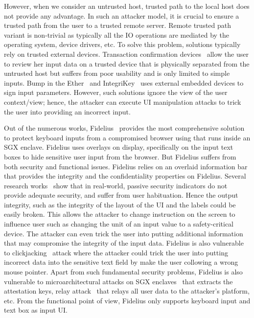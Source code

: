 However, when we consider an untrusted host, trusted path to the local host does not provide any advantage. In such an attacker model, it is crucial to ensure a trusted path from the user to a trusted remote server. Remote trusted path variant is non-trivial as typically all the IO operations are mediated by the operating system, device drivers, etc. To solve this problem, solutions typically rely on trusted external devices. Transaction confirmation devices~\cite{filyanov2011uni,weigold2011secure} allow the user to review her input data on a trusted device that is physically separated from the untrusted host but suffers from poor usability and is only limited to simple inputs. Bump in the Ether~\cite{McCPerRei2006} and IntegriKey~\cite{IntegriKey} uses external embedded devices to sign input parameters. However, such solutions ignore the view of the user context/view; hence, the attacker can execute UI manipulation attacks to trick the user into providing an incorrect input.

Out of the numerous works, Fidelius~\cite{Fidelius} provides the most comprehensive solution to protect keyboard inputs from a compromised browser using  \js {} that runs inside an SGX enclave. Fidelius uses overlays on display, specifically on the input text boxes to hide sensitive user input from the browser. But Fidelius suffers from both security and functional issues. Fidelius relies on an overlaid information bar that provides the integrity and the confidentiality properties on Fidelius. Several research works~\cite{egelman2008you,sobey2008exploring} show that in real-world, passive security indicators do not provide adequate security, and suffer from user habituation. Hence the output integrity, such as the integrity of the layout of the UI and the labels could be easily broken. This allows the attacker to change instruction on the screen to influence user such as changing the unit of an input value to a safety-critical device. The attacker can even trick the user into putting additional information that may compromise the integrity of the input data. Fidelius is also vulnerable to clickjacking~\cite{huang2012clickjacking} attack where the attacker could trick the user into putting incorrect data into the sensitive text field by make the user collowing a wrong mouse pointer. Apart from such fundamental security problems, Fidelius is also vulnerable to  microarchitectural attacks on SGX enclaves~\cite{van2018foreshadow} that extracts the attestation keys, relay attack~\cite{dhar2018proximitee} that relays all user data to the attacker's platform, etc. From the functional point of view, Fidelius only supports keyboard input and text box as input UI.
 
